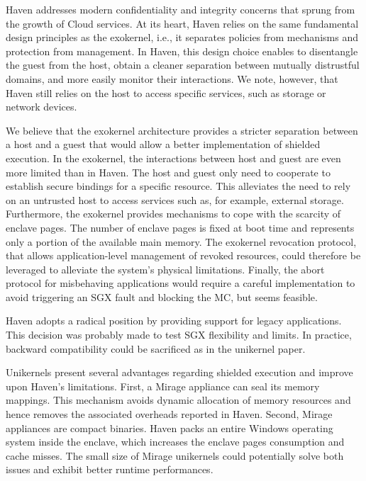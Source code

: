 Haven addresses modern confidentiality and integrity concerns that sprung from the growth of Cloud services.
At its heart, Haven relies on the same fundamental design principles as the exokernel, i.e., it separates policies from mechanisms and protection from management.
In Haven, this design choice enables to disentangle the guest from the host, obtain a cleaner separation between mutually distrustful domains, and more easily monitor their interactions.
We note, however, that Haven still relies on the host to access specific services, such as storage or network devices.

We believe that the exokernel architecture provides a stricter separation between a host and a guest that would allow a better implementation of shielded execution.
In the exokernel, the interactions between host and guest are even more limited than in Haven.
The host and guest only need to cooperate to establish secure bindings for a specific resource.
This alleviates the need to rely on an untrusted host to access services such as, for example, external storage.
Furthermore, the exokernel provides mechanisms to cope with the scarcity of enclave pages.
The number of enclave pages is fixed at boot time and represents only a portion of the available main memory.
The exokernel revocation protocol, that allows application-level management of revoked resources, could therefore be leveraged to alleviate the system's physical limitations.
Finally, the abort protocol for misbehaving applications would require a careful implementation to avoid triggering an SGX fault and blocking the MC, but seems feasible.

Haven adopts a radical position by providing support for legacy applications.
This decision was probably made to test SGX flexibility and limits.
In practice, backward compatibility could be sacrificed as in the unikernel paper.

Unikernels present several advantages regarding shielded execution and improve upon Haven's limitations.
First, a Mirage appliance can seal its memory mappings.
This mechanism avoids dynamic allocation of memory resources and hence removes the associated overheads reported in Haven.
Second, Mirage appliances are compact binaries.
Haven packs an entire Windows operating system inside the enclave, which increases the enclave pages consumption and cache misses.
The small size of Mirage unikernels could potentially solve both issues and exhibit better runtime performances.
